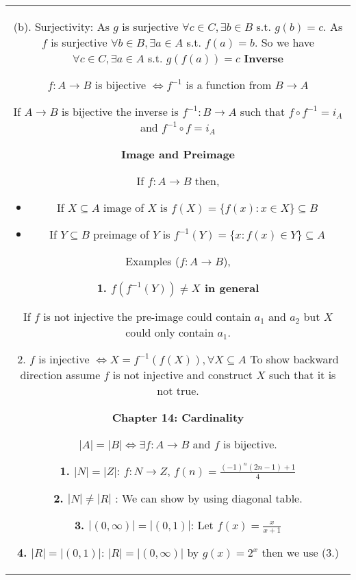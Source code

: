 \documentclass[a4paper]{article}
\begin{document}
    \begin{tabular}{@{}c@{}}
    \begin{minipage}[t][\paperheight][t]{0.49\paperwidth}%

    (b). Surjectivity: As  $g$ is surjective $\forall c \in C,\exists b \in B$ s.t. $g(b) = c$. As  $f$ is surjective $\forall b \in B, \exists  a \in A$ s.t. $f(a) = b$. So we have  $\forall c \in C, \exists a \in A$ s.t. $g(f(a)) = c$
        \textbf{Inverse}

        $f:A \rightarrow B$ is bijective $\iff f^{-1}$ is a function from $B \rightarrow A$

        If $A \rightarrow B$ is bijective the inverse is $f^{-1}:B \rightarrow A$ such that $f\circ f^{-1} = i_A$ and $f^{-1} \circ f = i_A$


        \textbf{Image and Preimage}

        If $f:A \rightarrow B$ then, 
        \begin{itemize}
            \item If $X \subseteq A$ image of $X$ is $f(X) = \{f(x): x \in X\} \subseteq B$
            \item If $Y \subseteq B$ preimage of $Y$ is $f^{-1}(Y) = \{x: f(x) \in Y\} \subseteq A$
        \end{itemize}


        Examples ($f:A \rightarrow B$),

        \textbf{1. $f(f^{-1}(Y)) \ne X$ in general}

        If $f$ is not injective the pre-image could contain $a_1$ and $a_2$ but $X$ could only contain $a_1$.

        2. $f$ is injective $\iff X = f^{-1}(f(X)), \forall X \subseteq A$ 
        To show backward direction assume $f$ is not injective and construct $X$ such that it is not true.


        \textbf{Chapter 14: Cardinality}

        $|A| = |B| \iff \exists f: A \rightarrow B$ and $f$ is bijective.

        \textbf{1. $|N| = |Z|$}:   $f: N \rightarrow Z$, $f(n) = \frac{(-1)^{n} (2n - 1) + 1}{4}$

        \textbf{2. $|N| \ne |R|$ }: We can show by using diagonal table.

        \textbf{3. $|(0,\infty)| = |(0,1)|$}: Let $f(x) = \frac{x}{x+1}$ 

        \textbf{4. $|R| = |(0,1)|$}: $|R| = |(0,\infty)|$ by  $g(x) = 2^{x}$ then we use (3.)



\end{minipage}
\end{tabular}
\end{document}
